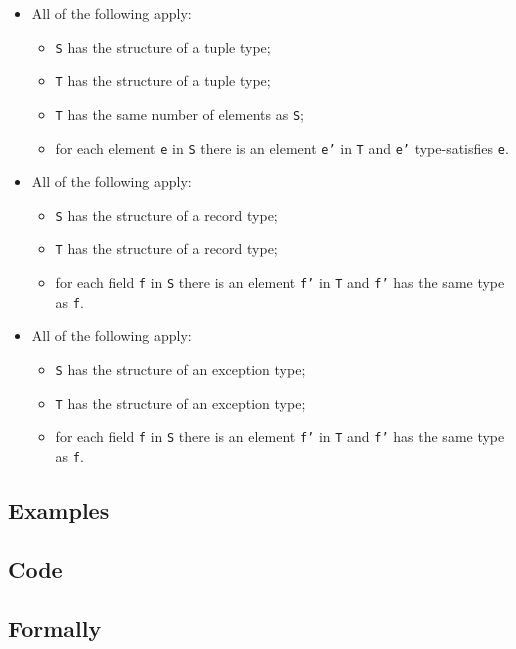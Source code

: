 \documentclass{book}
\begin{document}
\begin{itemize}
  \item All of the following apply:
    \begin{itemize}
    \item \texttt{S} has the structure of a tuple type;
    \item \texttt{T} has the structure of a tuple type;
    \item \texttt{T} has the same number of elements as \texttt{S};
    \item for each element \texttt{e} in \texttt{S} there is an element \texttt{e'} in \texttt{T} and \texttt{e'}
      type-satisfies \texttt{e}.
    \end{itemize}  

  \item All of the following apply:
    \begin{itemize}
    \item \texttt{S} has the structure of a record type;
    \item \texttt{T} has the structure of a record type;
    \item for each field \texttt{f} in \texttt{S} there is an element \texttt{f'} in \texttt{T} and \texttt{f'} has
      the same type as \texttt{f}.
    \end{itemize}

  \item All of the following apply:
    \begin{itemize}
    \item \texttt{S} has the structure of an exception type;
    \item \texttt{T} has the structure of an exception type;
    \item for each field \texttt{f} in \texttt{S} there is an element \texttt{f'} in \texttt{T} and \texttt{f'} has
      the same type as \texttt{f}.
    \end{itemize}
  \end{itemize}

  \subsection{Examples}

  \subsection{Code}

  \subsection{Formally}
\end{document}
